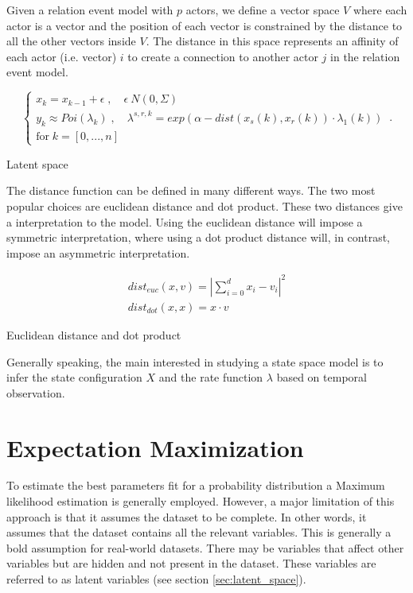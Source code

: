 \documentclass[mscthesis]{usiinfthesis}
\begin{document}
Given a relation event model with $p$ actors, we define a vector space $V$ where each actor is a vector and the position of each vector is constrained by the distance to all the other vectors inside $V$. The distance in this space represents an affinity of each actor (i.e. vector) $i$ to create a connection to another actor $j$ in the relation event model.


\begin{eqfloat}
\begin{equation}
    \begin{cases}
      x_k = x_{k-1} + \epsilon \; , \quad \epsilon ~ N(0, \Sigma) \\
      y_k \approx Poi(\lambda_k) \; , \quad \lambda^{s, r, k} = exp\left(\alpha-dist(x_s(k), x_r(k)) \cdot \lambda_1(k) \right) \\
      \textrm{for} \; k = [0, ..., n]
    \end{cases}\,.
\label{eq:latent_randomwalk}
\end{equation}
\caption{Latent space}
\end{eqfloat}

The distance function can be defined in many different ways. The two most popular choices are euclidean distance and dot product. These two distances give a interpretation to the model. Using the euclidean distance will impose a symmetric interpretation, where using a dot product distance will, in contrast, impose an asymmetric interpretation.

\begin{eqfloat}
\begin{equation}
\begin{array}{l}
dist_{euc}(x, v) = |\sum_{i=0}^d x_i - v_i|^2 \\
dist_{dot}(x, x) = x \cdot v
\end{array}
\label{eq:latent_randomwalk}
\end{equation}
\caption{Euclidean distance and dot product}
\end{eqfloat}

Generally speaking, the main interested in studying a state space model is to infer the state configuration $X$ and the rate function $\lambda$ based on temporal observation.

\section{Expectation Maximization}

To estimate the best parameters fit for a probability distribution a Maximum likelihood estimation is generally employed. However, a major limitation of this approach is that it assumes the dataset to be complete. In other words, it assumes that the dataset contains all the relevant variables. This is generally a bold assumption for real-world datasets. There may be variables that affect other variables but are hidden and not present in the dataset. These variables are referred to as latent variables (see section \ref{sec:latent_space}).
\end{document}
